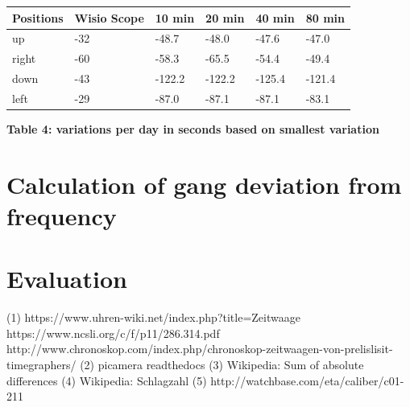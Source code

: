 \documentclass[12pt, a4paper]{report}
\begin{document}
    \begin{table}[H]
        \begin{tabular}{|l|l|l|l|l|l|}
        \hline
        Positions & Wisio Scope & 10 min & 20 min & 40 min & 80 min \\ \hline
        up        & -32                & -48.7     & -48.0     & -47.6      & -47.0      \\ \hline
        right     & -60                 & -58.3      & -65.5    & -54.4      & -49.4      \\ \hline
        down      & -43                 & -122.2    & -122.2     & -125.4    & -121.4      \\ \hline
        left      & -29                & -87.0	   & -87.1	  & -87.1	  & -83.1      \\ \hline
        \end{tabular}
    \end{table}
    \begin{center}    
    {\bf Table 4: variations per day in seconds based on smallest variation} 
    \end{center}
    
    \section{Calculation of gang deviation from frequency}
    
    \section{Evaluation}
    
    
    \glsaddall
    \printglossaries
    
    \begin{thebibliography}{9}
    \bigskip
    (1) https://www.uhren-wiki.net/index.php?title=Zeitwaage
     https://www.ncsli.org/c/f/p11/286.314.pdf
     http://www.chronoskop.com/index.php/chronoskop-zeitwaagen-von-prelislisit-timegraphers/
    \bibitem[Picamera]
    (2) picamera readthedocs
    \bibitem[SAD]
    (3) Wikipedia: Sum of absolute differences
    \bibitem[Schlagzahl]
    (4) Wikipedia: Schlagzahl
    (5) http://watchbase.com/eta/caliber/c01-211
    \end{thebibliography}
    
    \pagebreak
    
    \listoffigures
    \bigskip
    
    
    
    
\end{document}
